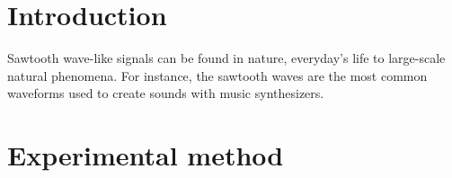 \documentclass[aps,pre,preprint,groupedaddress,showkeys]{revtex4-2}
\begin{document}
\maketitle

\section{Introduction}\label{intro}
Sawtooth wave-like signals can be found in nature, everyday's life to large-scale natural phenomena. 
For instance, the sawtooth waves are the most common waveforms used to create sounds with music synthesizers.


\section{Experimental method}\label{met}
\end{document}
